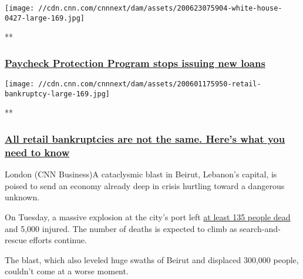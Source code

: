 \href{/videos/business/2020/06/30/paycheck-protection-program-loans-coronavirus-mattingly-pkg-newday-vpx.cnn/video/playlists/business-economy/}{}

\texttt{[image: //cdn.cnn.com/cnnnext/dam/assets/200623075904-white-house-0427-large-169.jpg]}

**

\hypertarget{paycheck-protection-program-stops-issuing-new-loans}{%
\subsubsection{\texorpdfstring{\href{/videos/business/2020/06/30/paycheck-protection-program-loans-coronavirus-mattingly-pkg-newday-vpx.cnn/video/playlists/business-economy/}{Paycheck
Protection Program stops issuing new
loans}}{Paycheck Protection Program stops issuing new loans}}\label{paycheck-protection-program-stops-issuing-new-loans}}

\href{/videos/business/2020/06/01/retail-bankruptcies-explained-orig.cnn/video/playlists/business-economy/}{}

\texttt{[image: //cdn.cnn.com/cnnnext/dam/assets/200601175950-retail-bankruptcy-large-169.jpg]}

**

\hypertarget{all-retail-bankruptcies-are-not-the-same-heres-what-you-need-to-know}{%
\subsubsection{\texorpdfstring{\href{/videos/business/2020/06/01/retail-bankruptcies-explained-orig.cnn/video/playlists/business-economy/}{All
retail bankruptcies are not the same. Here's what you need to
know}}{All retail bankruptcies are not the same. Here's what you need to know}}\label{all-retail-bankruptcies-are-not-the-same-heres-what-you-need-to-know}}

London (CNN Business)A cataclysmic blast in Beirut, Lebanon's capital,
is poised to send an economy already deep in crisis hurtling toward a
dangerous unknown.

On Tuesday, a massive explosion at the city's port left
\href{https://cnn.com/2020/08/05/middleeast/beirut-port-explosion-ammonium-nitrate-intl-hnk/index.html}{at
least 135 people dead} and 5,000 injured. The number of deaths is
expected to climb as search-and-rescue efforts continue.

The blast, which also leveled huge swaths of Beirut and displaced
300,000 people, couldn't come at a worse moment.

